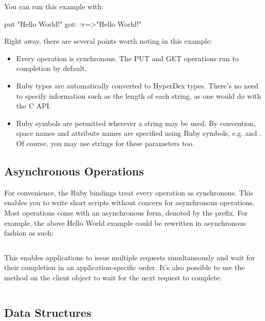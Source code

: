\inputminted{ruby}{\topdir/api/ruby/hello-world.rb}

You can run this example with:

\begin{consolecode}
put "Hello World!"
got:
{:v=>"Hello World!"}
\end{consolecode}

Right away, there are several points worth noting in this example:

\begin{itemize}
\item Every operation is synchronous.  The PUT and GET operations run to
completion by default.

\item Ruby types are automatically converted to HyperDex types.  There's no need
to specify information such as the length of each string, as one would do with
the C API.

\item Ruby symbols are permitted wherever a string may be used.  By convention,
space names and attribute names are specified using Ruby symbols, e.g.
 and .  Of course, you may use strings for these parameters
too.
\end{itemize}

\subsection{Asynchronous Operations}
\label{sec:api:ruby:async-ops}

For convenience, the Ruby bindings treat every operation as synchronous.  This
enables you to write short scripts without concern for asynchronous operations.
Most operations come with an asynchronous form, denoted by the 
prefix.  For example, the above Hello World example could be rewritten in
asynchronous fashion as such:

\inputminted{ruby}{\topdir/api/ruby/hello-world-async-wait.rb}

This enables applications to issue multiple requests simultaneously and wait for
their completion in an application-specific order.  It's also possible to use
the  method on the client object to wait for the next request to
complete:

\inputminted{ruby}{\topdir/api/ruby/hello-world-async-loop.rb}

\subsection{Data Structures}
\label{sec:api:ruby:data-structures}

